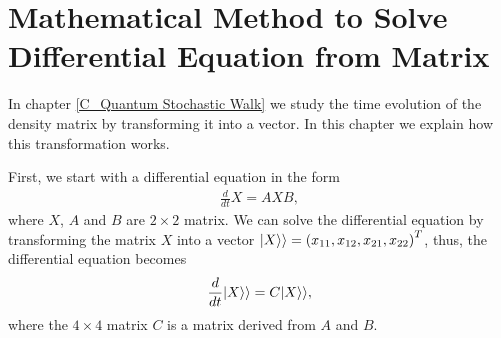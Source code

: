 \chapter{Mathematical Method to Solve Differential Equation from Matrix}\label{A_vectorial_density_matrix}

In chapter \ref{C_Quantum Stochastic Walk} we study the time evolution of the density matrix by transforming it into a vector. In this chapter we explain how this transformation works.

First, we start with a differential equation in the form
\begin{eqnarray}
    \frac{d}{dt} X = A X B,
\end{eqnarray}
where $X$, $A$ and $B$ are $2\times 2$ matrix. 
We can solve the differential equation by transforming the matrix $X$ into a vector $\lvert X\rangle\rangle = \left(x_{11}, x_{12},x_{21}, x_{22}\right)^T$, thus, the differential equation becomes
\begin{equation}
    \frac{d}{dt} \lvert X\rangle\rangle = C \lvert X\rangle\rangle,
\end{equation}
where the $4\times 4$ matrix $C$ is a matrix derived from $A$ and $B$.

